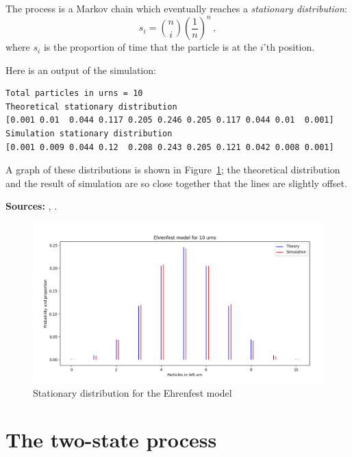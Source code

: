 \documentclass[11pt,a4paper]{article}
\newcommand*{\dischoose}[2]{\displaystyle{#1 \choose #2}}
\begin{document}
The process is a Markov chain which eventually reaches a \emph{stationary distribution}:
\[
s_i=\dischoose{n}{i}\left(\frac{1}{n}\right)^n\,,
\]
where $s_i$ is the proportion of time that the particle is at the $i$'th position.

Here is an output of the simulation:
\begin{verbatim}
Total particles in urns = 10
Theoretical stationary distribution
[0.001 0.01  0.044 0.117 0.205 0.246 0.205 0.117 0.044 0.01  0.001]
Simulation stationary distribution
[0.001 0.009 0.044 0.12  0.208 0.243 0.205 0.121 0.042 0.008 0.001]
\end{verbatim}
A graph of these distributions is shown in Figure~\ref{f.ehrenfest1}; the theoretical distribution and the result of simulation are so close together that the lines are slightly offset.

\textbf{Sources:} \cite[Example 11.4.6]{BW}, \cite[Section 4.3]{privault}. 

\begin{figure}
\begin{center}
\includegraphics[width=\textwidth]{ehrenfest-01}
\caption{Stationary distribution for the Ehrenfest model}\label{f.ehrenfest1}
\end{center}
\end{figure}


\section{The two-state process}\label{s.two-state}
\end{document}
